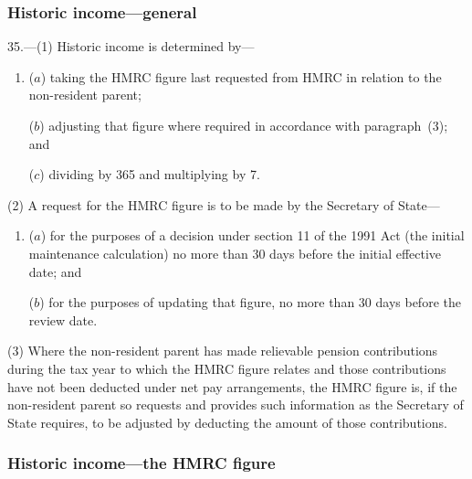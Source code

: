 \documentclass[12pt,a4paper]{article}
\begin{document}
\subsubsection[35. Historic income---general]{Historic income---general}

35.---(1)  Historic income is determined by—
\begin{enumerate}\item[]
($a$) taking the HMRC figure last requested from HMRC in relation to the non-resident parent;

\begin{sloppypar}
($b$) adjusting that figure where required in accordance with paragraph~(3); and
\end{sloppypar}

($c$) dividing by 365 and multiplying by 7.
\end{enumerate}

(2) A request for the HMRC figure is to be made by the Secretary of State—
\begin{enumerate}\item[]
($a$) for the purposes of a decision under section 11 of the 1991 Act (the initial maintenance calculation) no more than 30 days before the initial effective date; and

($b$) for the purposes of updating that figure, no more than 30 days before the review date.
\end{enumerate}

(3) Where the non-resident parent has made relievable pension contributions during the tax year to which the HMRC figure relates and those contributions have not been deducted under net pay arrangements, the HMRC figure is, if the non-resident parent so requests and provides such information as the Secretary of State requires, to be adjusted by deducting the amount of those contributions.

\subsubsection[36. Historic income---the HMRC figure]{Historic income---the HMRC figure}
\end{document}
